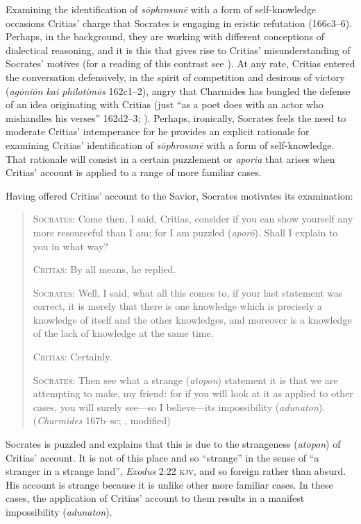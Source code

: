 Examining the identification of \emph{sōphrosunē} with a form of self-knowledge occasions Critias' charge that Socrates is engaging in eristic refutation (166c3–6). Perhaps, in the background, they are working with different conceptions of dialectical reasoning, and it is this that gives rise to Critias' misunderstanding of Socrates' motives (for a reading of this contrast see \citealt[chapter 4]{Schmid:1998aa}). At any rate, Critias entered the conversation defensively, in the spirit of competition and desirous of victory (\emph{agōniōn kai philotimōs} 162c1–2), angry that Charmides has bungled the defense of an idea originating with Critias (just ``as a poet does with an actor who mishandles his verses'' 162d2–3; \citealt[41]{Lamb:1927qw}). Perhaps, ironically, Socrates feels the need to moderate Critias' intemperance for he provides an explicit rationale for examining Critias' identification of \emph{sōphrosunē} with a form of self-knowledge. That rationale will consist in a certain puzzlement or \emph{aporia} that arises when Critias' account is applied to a range of more familiar cases.

Having offered Critias' account to the Savior, Socrates motivates its examination:
\begin{quotation}
	\textsc{Socrates}: Come then, I said, Critias, consider if you can show yourself any more resourceful than I am; for I am puzzled (\emph{aporō}). Shall I explain to you in what way?
	
	\textsc{Critias}: By all means, he replied.
	
	\textsc{Socrates}: Well, I said, what all this comes to, if your last statement was correct, it is merely that there is one knowledge which is precisely a knowledge of itself and the other knowledges, and moreover is a knowledge of the lack of knowledge at the same time.
	
	\textsc{Critias}: Certainly.
	
	\textsc{Socrates}: Then see what a strange (\emph{atopon}) statement it is that we are attempting to make, my friend: for if you will look at it as applied to other cases, you will surely see—so I believe—its impossibility (\emph{adunaton}). (\emph{Charmides} 167b–sc; \citealt[57]{Lamb:1927qw}, modified)
\end{quotation}

Socrates is puzzled and explains that this is due to the strangeness (\emph{atopon}) of  Critias' account. It is not of this place and so ``strange'' in the sense of ``a stranger in a strange land'', \emph{Exodus} 2:22 \textsc{kjv}, and so foreign rather than absurd. His account is strange because it is unlike other more familiar cases. In these cases, the application of Critias' account to them results in a manifest impossibility (\emph{adunaton}). 

